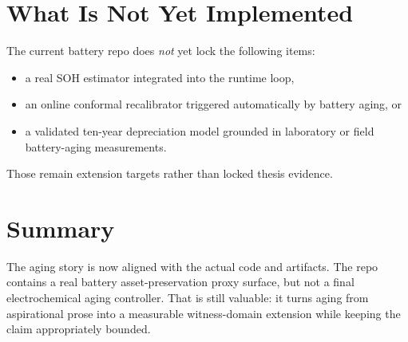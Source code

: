 \section{What Is Not Yet Implemented}

The current battery repo does \emph{not} yet lock the following items:

\begin{itemize}
  \item a real SOH estimator integrated into the runtime loop,
  \item an online conformal recalibrator triggered automatically by battery
    aging, or
  \item a validated ten-year depreciation model grounded in laboratory or
    field battery-aging measurements.
\end{itemize}

Those remain extension targets rather than locked thesis evidence.

\section{Summary}

The aging story is now aligned with the actual code and artifacts.  The repo
contains a real battery asset-preservation proxy surface, but not a final
electrochemical aging controller.  That is still valuable: it turns aging
from aspirational prose into a measurable witness-domain extension while
keeping the claim appropriately bounded.
